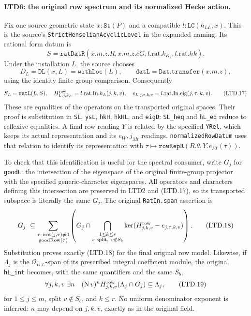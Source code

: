 \paragraph{LTD6: the original row spectrum and its normalized Hecke action.}
\label{claim:LTD6}
Fix one source geometric state \(x:\texttt{St}(P)\) and a
compatible \(l:\texttt{LC}(h_{LL},x)\).  This is the source's
\texttt{StrictHenselian}\allowbreak\texttt{AcyclicLevel} in the expanded naming.
Its rational form datum is
\[
 S=\texttt{ratDatR}(x.m.z.R,x.m.z.cG,l.\mathrm{rat}.k_{K_s},
                                                l.\mathrm{rat}.hk).
\]
Under the installation \(L\), the source chooses
\[
 D_L=\texttt{DL}(x,L)=\texttt{withLoc}(L),\qquad
 \texttt{datL}=\texttt{Dat.transfer}(x.m.z),
\]
using the identity finite-group comparison.  Consequently
\[
 S_L=\texttt{ratL}(L,S),\quad H^{\rm row}_{L,j,k,v}
              =l.\mathrm{rat}.\mathrm{In}.h_L(j,k,v),\quad
 e_{L,j,\tau,k,v}=l.\mathrm{rat}.\mathrm{In}.\mathrm{eig}(j,\tau,k,v).
 \tag{LTD.17}
\]
These are equalities of the operators on the transported original
spaces.  Their proof is substitution in \texttt{SL},
\texttt{ysL}, \texttt{hkH}, \texttt{hkHL}, and \texttt{eigD}:
\texttt{SL\_heq} and \texttt{hL\_eq} reduce to reflexive
equalities.  A final row reading \(Y\) is related by the specified
\texttt{YRel}, which keeps its actual representation and its
\(e_W,j_{Mt}\) readings.  \texttt{normalizedRowDatum} uses that
relation to identify its representation with
\(\tau\mapsto\texttt{rowRepR}(R.\theta,Y.e_{FT}(\tau))\).

To check that this identification is useful for the spectral
consumer, write \(G_j\) for \texttt{goodL}: the intersection of
the eigenspace of the original finite-group projector with the
specified generic-character eigenspaces.  All operators and
characters defining this intersection are preserved in LTD2 and
(LTD.17), so its transported subspace is literally the same
\(G_j\).  The original \texttt{RatIn.span} assertion is
\[
 G_j\ \subseteq\sum_{\substack{\tau:\,\mathrm{isot}(j,\tau)\ne0\\
                                      \mathrm{goodRow}(\tau)}}
 \left(G_j\cap\bigcap_{\substack{1\le k\le r\\
                      v\text{ split},\ v\notin S_b}}
       \ker(H^{\rm row}_{j,k,v}-e_{j,\tau,k,v})\right).
 \tag{LTD.18}
\]
Substitution proves exactly (LTD.18) for the final original row
model.  Likewise, if \(\Lambda_j\) is the
\(\mathcal O_{D.L}\)-span of its prescribed integral coefficient
module, the original \texttt{hL\_int} becomes, with the same
quantifiers and the same \(S_b\),
\[
 \forall j,k,v\ \exists n\quad
     (\operatorname{N}v)^n H^{\rm row}_{j,k,v}
                    (\Lambda_j\cap G_j)\subseteq\Lambda_j,
 \tag{LTD.19}
\]
for \(1\le j\le m\), split \(v\notin S_b\), and \(k\le r\).
No uniform denominator exponent is inferred: \(n\) may depend
on \(j,k,v\), exactly as in the original field.

